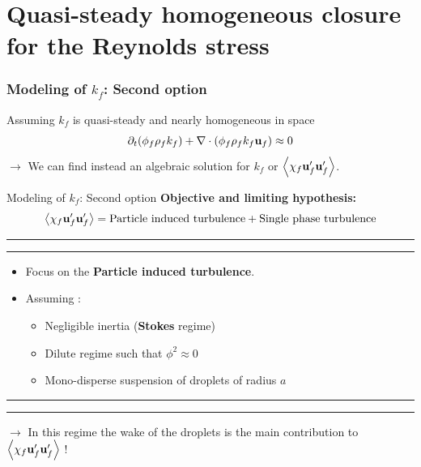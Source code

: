 \documentclass{sintefbeamer}
\begin{document}
\section{Quasi-steady homogeneous closure for the Reynolds stress}
\begin{frame}
  \frametitle{Modeling of $k_f$: Second option}
Assuming $k_f$ is quasi-steady and nearly homogeneous in space
\begin{equation}
  \partial_t (\phi_f\rho_fk_f)  
    + \mathbf{\nabla}\cdot (
        \phi_f\rho_fk_f\textbf{u}_f
        )
        \approx 
    0 
\end{equation}
\vfill
$\to$ We can find instead an algebraic solution for $k_f$ or $\left<\chi_f \textbf{u}_f'\textbf{u}_f'\right>$. 
\end{frame}


\begin{frame}{Modeling of $k_f$: Second option}
  \textbf{Objective and limiting hypothesis:}
  \begin{equation*}
     \left<\chi_f \textbf{u}_f'\textbf{u}_f'\right>
     = 
     \text{Particle induced turbulence}
     + \text{Single phase turbulence}
  \end{equation*}
  \hrule\hrule
  \pause
  \begin{itemize}
    \item 
    Focus on the \textbf{Particle induced turbulence}. 
    \item Assuming : 
    \begin{itemize}
      \item Negligible inertia (\textbf{Stokes} regime)
      \item Dilute regime such that $\phi^{2} \approx 0$ 
      \item Mono-disperse suspension of droplets of radius $a$
    \end{itemize}
  \end{itemize}
\hrule\hrule
$\to$ In this regime the wake of the droplets is the main contribution to  $\left<\chi_f\textbf{u}_f'\textbf{u}_f'\right>$ !
\hfill
\end{frame}
\end{document}
